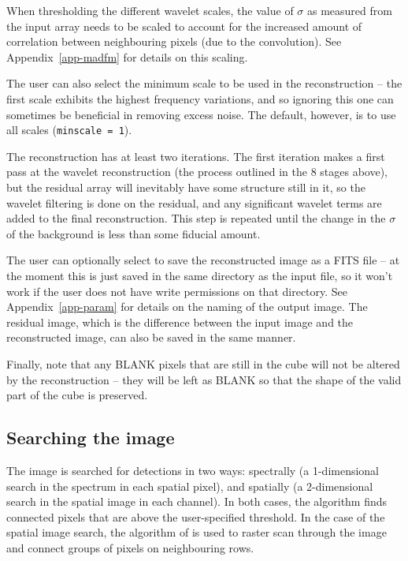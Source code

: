 \documentclass[12pt,a4paper]{article}
\begin{document}
When thresholding the different wavelet scales, the value of $\sigma$
as measured from the input array needs to be scaled to account for the
increased amount of correlation between neighbouring pixels (due to
the convolution). See Appendix~\ref{app-madfm} for details on this
scaling. 

The user can also select the minimum scale to be used in the
reconstruction -- the first scale exhibits the highest frequency
variations, and so ignoring this one can sometimes be beneficial in
removing excess noise. The default, however, is to use all scales
({\tt minscale = 1}).

The reconstruction has at least two iterations. The first iteration
makes a first pass at the wavelet reconstruction (the process outlined
in the 8 stages above), but the residual array will inevitably have
some structure still in it, so the wavelet filtering is done on the
residual, and any significant wavelet terms are added to the final
reconstruction. This step is repeated until the change in the $\sigma$
of the background is less than some fiducial amount.

The user can optionally select to save the reconstructed image as a
FITS file -- at the moment this is just saved in the same directory as
the input file, so it won't work if the user does not have write
permissions on that directory. See Appendix~\ref{app-param} for details
on the naming of the output image. The residual image, which is the
difference between the input image and the reconstructed image, can
also be saved in the same manner. 

Finally, note that any BLANK pixels that are still in the cube
will not be altered by the reconstruction -- they will be left as
BLANK so that the shape of the valid part of the cube is preserved.

\subsection{Searching the image}
\label{sec-detection}

The image is searched for detections in two ways: spectrally (a
1-dimensional search in the spectrum in each spatial pixel), and
spatially (a 2-dimensional search in the spatial image in each
channel). In both cases, the algorithm finds connected pixels that are
above the user-specified threshold. In the case of the spatial image
search, the algorithm of \citet{lutz80} is used to raster scan through
the image and connect groups of pixels on neighbouring rows.
\end{document}
